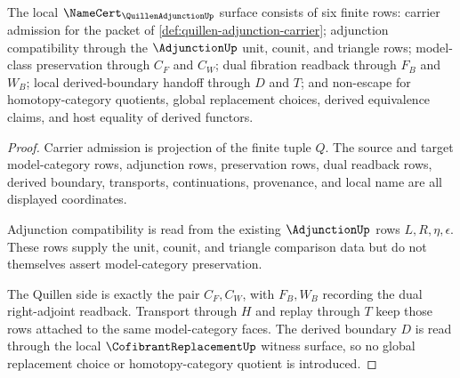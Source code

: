 \begin{theorem}
\label{thm:quillen-adjunction-namecert-obligations}
The local $\NameCert_{\QuillenAdjunctionUp}$ surface consists of six finite rows: carrier admission for the packet of \autoref{def:quillen-adjunction-carrier}; adjunction compatibility through the $\AdjunctionUp$ unit, counit, and triangle rows; model-class preservation through $C_F$ and $C_W$; dual fibration readback through $F_B$ and $W_B$; local derived-boundary handoff through $D$ and $T$; and non-escape for homotopy-category quotients, global replacement choices, derived equivalence claims, and host equality of derived functors.
\end{theorem}
\begin{proof}
Carrier admission is projection of the finite tuple $Q$. The source and target model-category rows, adjunction rows, preservation rows, dual readback rows, derived boundary, transports, continuations, provenance, and local name are all displayed coordinates.

Adjunction compatibility is read from the existing $\AdjunctionUp$ rows $L,R,\eta,\epsilon$. These rows supply the unit, counit, and triangle comparison data but do not themselves assert model-category preservation.

The Quillen side is exactly the pair $C_F,C_W$, with $F_B,W_B$ recording the dual right-adjoint readback. Transport through $H$ and replay through $T$ keep those rows attached to the same model-category faces. The derived boundary $D$ is read through the local $\CofibrantReplacementUp$ witness surface, so no global replacement choice or homotopy-category quotient is introduced.
\end{proof}

